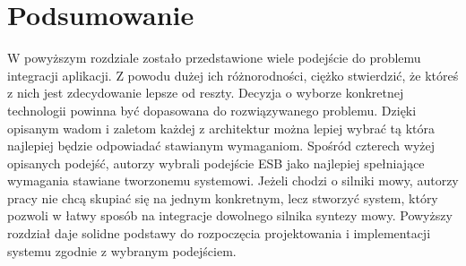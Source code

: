 \newpage
\section*{Podsumowanie}
W powyższym rozdziale zostało przedstawione wiele podejście do problemu integracji aplikacji. Z powodu dużej ich różnorodności, ciężko stwierdzić, że któreś z nich jest zdecydowanie lepsze od reszty. Decyzja o wyborze konkretnej technologii powinna być dopasowana do rozwiązywanego problemu. Dzięki opisanym wadom i zaletom każdej z architektur można lepiej wybrać tą która najlepiej będzie odpowiadać stawianym wymaganiom. Spośród czterech wyżej opisanych podejść, autorzy wybrali podejście ESB jako najlepiej spełniające wymagania stawiane tworzonemu systemowi. Jeżeli chodzi o silniki mowy, autorzy pracy nie chcą skupiać się na jednym  konkretnym, lecz stworzyć system, który pozwoli w łatwy sposób na integracje dowolnego silnika syntezy mowy. Powyższy rozdział daje solidne podstawy do rozpoczęcia projektowania i implementacji systemu  zgodnie z wybranym podejściem.




















